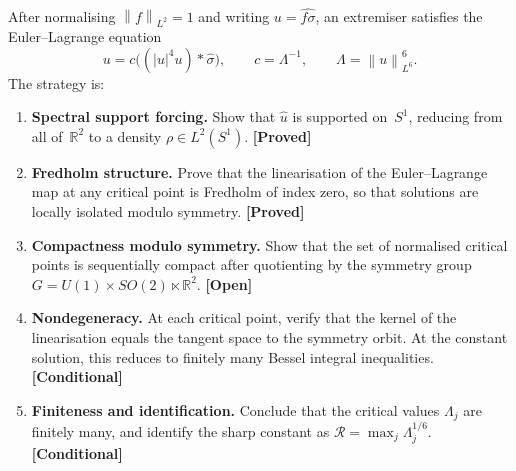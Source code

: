 \documentclass[12pt]{article}
\theoremstyle{definition}
\theoremstyle{remark}
\newcommand{\R}{\mathbb{R}}
\newcommand{\wh}{\widehat}
\newcommand{\norm}[1]{\left\|#1\right\|}
\newcommand{\proven}{\textbf{\color{teal}[Proved]}}
\newcommand{\conditional}{\textbf{\color{orange}[Conditional]}}
\newcommand{\open}{\textbf{\color{red}[Open]}}
\begin{document}
After normalising $\norm{f}_{L^2}=1$ and writing $u=\wh{f\sigma}$, an
extremiser satisfies the Euler--Lagrange equation
\[
  u = c\bigl((|u|^4u)\ast\wh\sigma\bigr),
  \qquad c=\Lambda^{-1},\qquad \Lambda=\norm{u}_{L^6}^6.
\]
The strategy is:
\begin{enumerate}[leftmargin=2em]
  \item \textbf{Spectral support forcing.}  Show that $\wh u$ is supported
    on~$S^1$, reducing from all of~$\R^2$ to a density
    $\rho\in L^2(S^1)$.  \proven
  \item \textbf{Fredholm structure.}  Prove that the linearisation of the
    Euler--Lagrange map at any critical point is Fredholm of index zero,
    so that solutions are locally isolated modulo symmetry.  \proven
  \item \textbf{Compactness modulo symmetry.}  Show that the set of normalised
    critical points is sequentially compact after quotienting by the symmetry
    group $G=U(1)\times SO(2)\ltimes\R^2$.  \open
  \item \textbf{Nondegeneracy.}  At each critical point, verify that the kernel
    of the linearisation equals the tangent space to the symmetry orbit.
    At the constant solution, this reduces to finitely many Bessel integral
    inequalities.  \conditional
  \item \textbf{Finiteness and identification.}  Conclude that the critical
    values $\Lambda_j$ are finitely many, and identify the sharp constant as
    $\mathcal R = \max_j \Lambda_j^{1/6}$.  \conditional
\end{enumerate}
\end{document}
